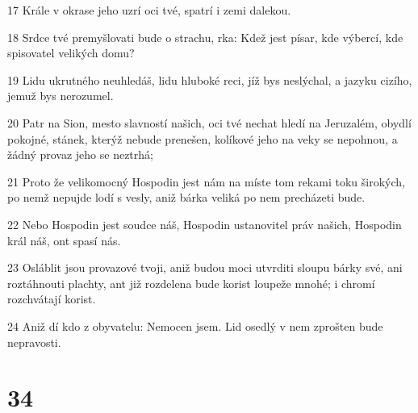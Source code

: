 \par 17 Krále v okrase jeho uzrí oci tvé, spatrí i zemi dalekou.
\par 18 Srdce tvé premyšlovati bude o strachu, rka: Kdež jest písar, kde výbercí, kde spisovatel velikých domu?
\par 19 Lidu ukrutného neuhledáš, lidu hluboké reci, jíž bys neslýchal, a jazyku cizího, jemuž bys nerozumel.
\par 20 Patr na Sion, mesto slavností našich, oci tvé nechat hledí na Jeruzalém, obydlí pokojné, stánek, kterýž nebude prenešen, kolíkové jeho na veky se nepohnou, a žádný provaz jeho se neztrhá;
\par 21 Proto že velikomocný Hospodin jest nám na míste tom rekami toku širokých, po nemž nepujde lodí s vesly, aniž bárka veliká po nem precházeti bude.
\par 22 Nebo Hospodin jest soudce náš, Hospodin ustanovitel práv našich, Hospodin král náš, ont spasí nás.
\par 23 Osláblit jsou provazové tvoji, aniž budou moci utvrditi sloupu bárky své, ani roztáhnouti plachty, ant již rozdelena bude korist loupeže mnohé; i chromí rozchvátají korist.
\par 24 Aniž dí kdo z obyvatelu: Nemocen jsem. Lid osedlý v nem zprošten bude nepravosti.

\chapter{34}

